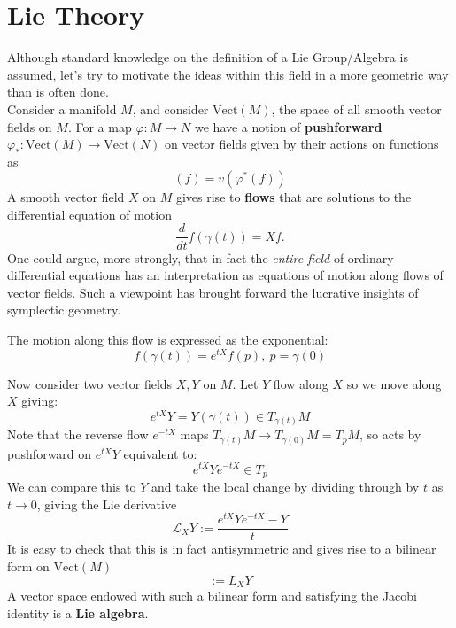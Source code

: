 		\section{Lie Theory}
		
		Although standard knowledge on the definition of a Lie Group/Algebra is assumed, let's try to motivate the ideas within this field in a more geometric way than is often done. \\
		
		Consider a manifold $M$, and consider $\text{Vect}(M)$, the space of all smooth vector fields on $M$. For a map $\varphi: M \rightarrow N$ we have a notion of \textbf{pushforward} $\varphi_*: \text{Vect}(M) \rightarrow \text{Vect}(N)$ on vector fields given by their actions on functions as
		\begin{equation}
			[\varphi_* (v)] (f) = v (\varphi^* (f))
		\end{equation}
		A smooth vector field $X$ on $M$ gives rise to \textbf{flows} that are solutions to the differential equation of motion
		\begin{equation}
			\frac{d}{dt} f(\gamma(t)) = X f.
		\end{equation}
		One could argue, more strongly, that in fact the \emph{entire field} of ordinary differential equations has an interpretation as equations of motion along flows of vector fields. Such a viewpoint has brought forward the lucrative insights of symplectic geometry. 
		
		The motion along this flow is expressed as the exponential:
		\begin{equation}
			f(\gamma(t)) = e^{t X} f(p), ~ p = \gamma(0)
		\end{equation}
		
		Now consider two vector fields $X,Y$ on $M$. Let $Y$ flow along $X$ so we move along $X$ giving:
		\begin{equation}
			e^{tX} Y = Y(\gamma(t)) \in T_{\gamma(t)}M
		\end{equation}
		Note that the reverse flow $e^{-t X}$ maps $T_{\gamma(t)} M \to T_{\gamma(0)}M = T_pM$, so acts by pushforward on $e^{tX} Y$ equivalent to:
		\begin{equation}
			e^{tX} Y e^{-tX} \in T_p
		\end{equation}
		We can compare this to $Y$ and take the local change by dividing through by $t$ as $t \to 0$, giving the Lie derivative
		\begin{equation}
			\mathcal L_X Y := \frac{e^{tX} Y e^{-tX} - Y}{t}
		\end{equation}
		It is easy to check that this is in fact antisymmetric and gives rise to a bilinear form on $\mathrm{Vect}(M)$
		\begin{equation}
			[X,Y]:= L_X Y
		\end{equation}
		A vector space endowed with such a bilinear form and satisfying the Jacobi identity is a \textbf{Lie algebra}.
		
